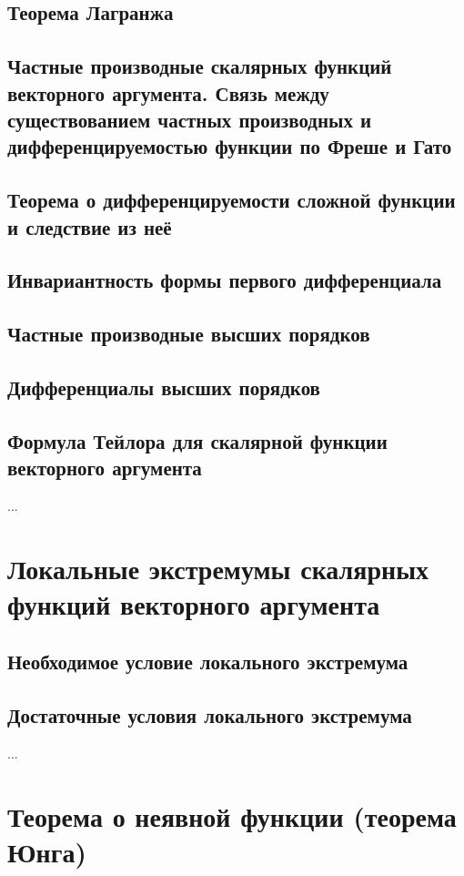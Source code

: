 \subsection{Теорема Лагранжа}

\subsection{Частные производные скалярных функций векторного аргумента. Связь между существованием частных производных и дифференцируемостью функции по Фреше и Гато}

\subsection{Теорема о дифференцируемости сложной функции и следствие из неё}

\subsection{Инвариантность формы первого дифференциала}
\subsection{Частные производные высших порядков}

\subsection{Дифференциалы высших порядков}

\subsection{Формула Тейлора для скалярной функции векторного аргумента}

...

\section{Локальные экстремумы скалярных функций векторного аргумента}
\subsection{Необходимое условие локального экстремума}
\subsection{Достаточные условия локального экстремума}

...

\section{Теорема о неявной функции (теорема Юнга)}
